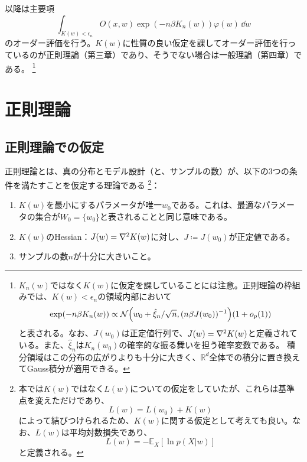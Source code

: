 \documentclass[dvipdfmx]{jsarticle}
\begin{document}
以降は主要項
\begin{equation}
    \int_{K(w)<\epsilon_n} O(x,w)\exp(-n\beta K_n(w))\varphi(w)\,\dd{w} 
\end{equation}
のオーダー評価を行う。$K(w)$に性質の良い仮定を課してオーダー評価を行っているのが正則理論（第三章）であり、そうでない場合は一般理論（第四章）である。
\footnote{
    $K_n(w)$ではなく$K(w)$に仮定を課していることには注意。正則理論の枠組みでは、$K(w) < \epsilon_n$の領域内部において
    \begin{equation}
        \exp(-n\beta K_n(w))\propto  \mathcal{N}\qty(w_0 + \hat{\xi}_n/\sqrt{n}, (n\beta J(w_0))^{-1})(1+o_p(1))
    \end{equation}
    と表される。なお、$J(w_0)$は正定値行列で、$J(w)=\laplacian{K(w)}$と定義されている。また、$\hat{\xi}_n$は$K_n(w_0)$の確率的な振る舞いを担う確率変数である。
    積分領域はこの分布の広がりよりも十分に大きく、$\mathbb{R}^d$全体での積分に置き換えてGauss積分が適用できる。
}

\section{正則理論}
\subsection{正則理論での仮定}
正則理論とは、真の分布とモデル設計（と、サンプルの数）が、以下の3つの条件を満たすことを仮定する理論である
\footnote{
    本では$K(w)$ではなく$L(w)$についての仮定をしていたが、これらは基準点を変えただけであり、
    \begin{equation}
        L(w) = L(w_0) + K(w)
    \end{equation}
    によって結びつけられるため、$K(w)$に関する仮定として考えても良い。なお、$L(w)$は平均対数損失であり、
    \begin{equation}
        L(w) = -\mathbb{E}_X[\ln{p(X|w)}]
    \end{equation}
    と定義される。
}：
\begin{enumerate}
    \item $K(w)$を最小にするパラメータが唯一$w_0$である。これは、最適なパラメータの集合が$W_0=\{w_0\}$と表されることと同じ意味である。
    \item $K(w)$のHessian：$J(w)=\laplacian{K(w)}$に対し、$J\coloneqq J(w_0)$が正定値である。
    \item サンプルの数$n$が十分に大きいこと。
\end{enumerate}
\end{document}
